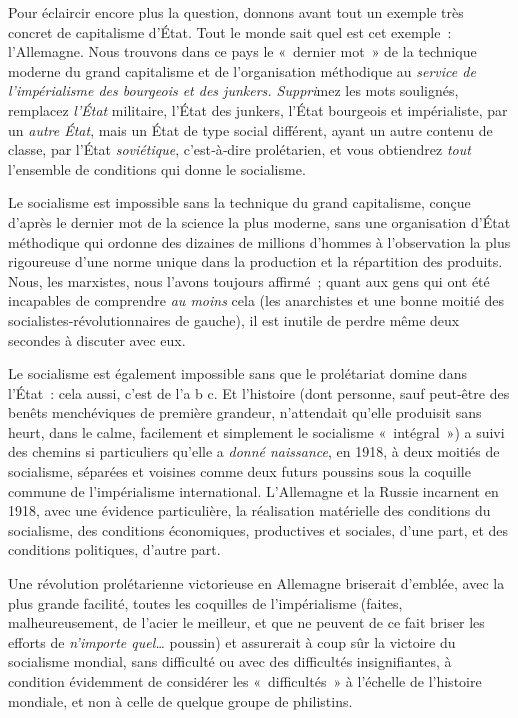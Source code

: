 \documentclass[french,twoside]{book} %
\begin{document}
Pour éclaircir encore plus la question, donnons avant tout un exemple très concret de capitalisme d’État. Tout le monde sait quel est cet exemple : l’Allemagne. Nous trouvons dans ce pays le « dernier mot » de la technique moderne du grand capitalisme et de l’organisation méthodique au \emph{service de l’impérialisme des bourgeois et des junkers. Suppri}mez les mots soulignés, remplacez \emph{l’État} militaire, l’État des junkers, l’État bourgeois et impérialiste, par un \emph{autre État}, mais un État de type social différent, ayant un autre contenu de classe, par l’État \emph{soviétique}, c’est‑à‑dire prolé­tarien, et vous obtiendrez \emph{tout} l’ensemble de conditions qui donne le socialisme.\par
Le socialisme est impossible sans la technique du grand capitalisme, conçue d’après le dernier mot de la science la plus moderne, sans une organisation d’État méthodique qui ordonne des dizaines de millions d’hommes à l’observa­tion la plus rigoureuse d’une norme unique dans la produc­tion et la répartition des produits. Nous, les marxistes, nous l’avons toujours affirmé ; quant aux gens qui ont été incapables de comprendre \emph{au moins} cela (les anarchistes et une bonne moitié des socialistes‑révolutionnaires de gau­che), il est inutile de perdre même deux secondes à discuter avec eux.\par
Le socialisme est également impossible sans que le prolétariat domine dans l’État : cela aussi, c’est de l’a b c. Et l’histoire (dont personne, sauf peut‑être des benêts menchéviques de première grandeur, n’attendait qu’elle produisit sans heurt, dans le calme, facilement et simplement le socialisme \hspace{1em}« intégral ») a suivi des chemins si particuliers qu’elle a \emph{donné naissance}, en 1918, à deux moitiés de socialisme, séparées et voisines comme deux futurs poussins sous la coquille commune de l’impérialisme international. L'Allemagne et la Russie incarnent en 1918, avec une évidence particulière, la réalisation matérielle des conditions du socialisme, des conditions économiques, productives et sociales, d’une part, et des conditions politiques, d’autre part.\par
Une révolution prolétarienne victorieuse en Allemagne briserait d’emblée, avec la plus grande facilité, toutes les coquilles de l’impérialisme (faites, malheureusement, de l’acier le meilleur, et que ne peuvent de ce fait briser les efforts de \emph{n’importe quel…} poussin) et assurerait à coup sûr la victoire du socialisme mondial, sans difficulté ou avec des difficultés insignifiantes, à condition évidemment de considérer les « difficultés » à l’échelle de l’histoire mondiale, et non à celle de quelque groupe de philistins.\par
\end{document}
